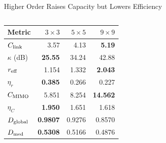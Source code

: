\begin{frame}[t]{Higher Order Raises Capacity but Lowers Efficiency}
\scriptsize
\begin{columns}[T,onlytextwidth]
  \renewcommand{\arraystretch}{1.18}
  \begin{tabularx}{\linewidth}{@{}Xrrr@{}}
    \toprule
    Metric & $3\times3$ & $5\times5$ & $9\times9$\\
    \midrule
    $C_{\rm link}$ & 3.57 & 4.13 & \textbf{5.19}\\
    $\kappa$ (dB) & \textbf{25.55} & 34.24 & 42.88\\
    $r_{\rm eff}$ & 1.154 & 1.332 & \textbf{2.043}\\
    $\eta_r$ & \textbf{0.385} & 0.266 & 0.227\\
    $C_{\rm MIMO}$ & 5.851 & 8.254 & \textbf{14.562}\\
    $\eta_C$ & \textbf{1.950} & 1.651 & 1.618\\
    $D_{\rm global}$ & \textbf{0.9807} & 0.9276 & 0.8570\\
    $D_{\rm med}$ & \textbf{0.5308} & 0.5166 & 0.4876\\
    \bottomrule
  \end{tabularx}


\end{columns}
\end{frame}
